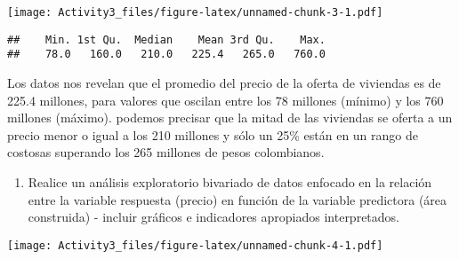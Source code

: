 \documentclass[
]{article}
\newenvironment{Shaded}{\begin{snugshade}}{\end{snugshade}}
\newcommand{\AttributeTok}[1]{\textcolor[rgb]{0.77,0.63,0.00}{#1}}
\newcommand{\FunctionTok}[1]{\textcolor[rgb]{0.00,0.00,0.00}{#1}}
\newcommand{\NormalTok}[1]{#1}
\newcommand{\OtherTok}[1]{\textcolor[rgb]{0.56,0.35,0.01}{#1}}
\newcommand{\SpecialCharTok}[1]{\textcolor[rgb]{0.00,0.00,0.00}{#1}}
\newcommand{\StringTok}[1]{\textcolor[rgb]{0.31,0.60,0.02}{#1}}
\providecommand{\tightlist}{%
  \setlength{\itemsep}{0pt}\setlength{\parskip}{0pt}}
\begin{document}
\texttt{[image: Activity3\_files/figure-latex/unnamed-chunk-3-1.pdf]}

\begin{Shaded}
\end{Shaded}

\begin{verbatim}
##    Min. 1st Qu.  Median    Mean 3rd Qu.    Max. 
##    78.0   160.0   210.0   225.4   265.0   760.0
\end{verbatim}

Los datos nos revelan que el promedio del precio de la oferta de
viviendas es de 225.4 millones, para valores que oscilan entre los 78
millones (mínimo) y los 760 millones (máximo). podemos precisar que la
mitad de las viviendas se oferta a un precio menor o igual a los 210
millones y sólo un 25\% están en un rango de costosas superando los 265
millones de pesos colombianos.

\begin{enumerate}
\def\labelenumi{\arabic{enumi}.}
\setcounter{enumi}{1}
\tightlist
\item
  Realice un análisis exploratorio bivariado de datos enfocado en la
  relación entre la variable respuesta (precio) en función de la
  variable predictora (área construida) - incluir gráficos e indicadores
  apropiados interpretados.
\end{enumerate}

\begin{Shaded}
\end{Shaded}

\texttt{[image: Activity3\_files/figure-latex/unnamed-chunk-4-1.pdf]}

\begin{Shaded}
\end{Shaded}
\end{document}
